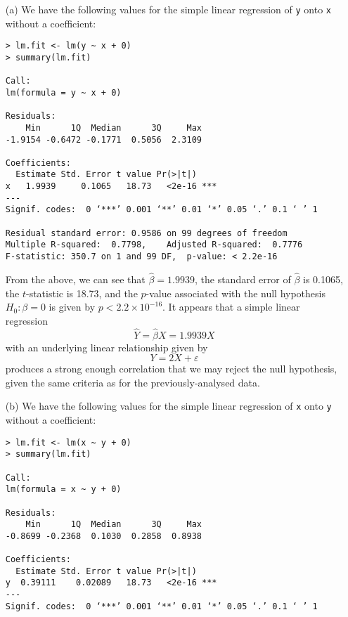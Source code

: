 
\begin{itemize}
    \item[(a)] We have the following values for the simple linear regression of
        \verb|y| onto \verb|x| without a coefficient:
        \scriptsize\begin{verbatim}
> lm.fit <- lm(y ~ x + 0)
> summary(lm.fit)

Call:
lm(formula = y ~ x + 0)

Residuals:
    Min      1Q  Median      3Q     Max 
-1.9154 -0.6472 -0.1771  0.5056  2.3109 

Coefficients:
  Estimate Std. Error t value Pr(>|t|)    
x   1.9939     0.1065   18.73   <2e-16 ***
---
Signif. codes:  0 ‘***’ 0.001 ‘**’ 0.01 ‘*’ 0.05 ‘.’ 0.1 ‘ ’ 1

Residual standard error: 0.9586 on 99 degrees of freedom
Multiple R-squared:  0.7798,    Adjusted R-squared:  0.7776 
F-statistic: 350.7 on 1 and 99 DF,  p-value: < 2.2e-16
        \end{verbatim}\normalsize
        From the above, we can see that $\hat{\beta} = 1.9939$, the standard error
        of $\hat{\beta}$ is 0.1065, the $t$-statistic is 18.73, and the $p$-value
        associated with the null hypothesis $H_0 : \beta = 0$ is given by 
        $p < 2.2 \times 10^{-16}$. It appears that a simple linear regression 
        \[
            \hat{Y} = \hat{\beta} X = 1.9939X
        \]
        with an underlying linear relationship given by 
        \[
            Y = 2X + \varepsilon
        \]
        produces a strong enough correlation that we may reject the null hypothesis, 
        given the same criteria as for the previously-analysed 
        data.
    \item[(b)] We have the following values for the simple linear regression of 
        \verb|x| onto \verb|y| without a coefficient:
        \scriptsize\begin{verbatim}
> lm.fit <- lm(x ~ y + 0)
> summary(lm.fit)

Call:
lm(formula = x ~ y + 0)

Residuals:
    Min      1Q  Median      3Q     Max 
-0.8699 -0.2368  0.1030  0.2858  0.8938 

Coefficients:
  Estimate Std. Error t value Pr(>|t|)    
y  0.39111    0.02089   18.73   <2e-16 ***
---
Signif. codes:  0 ‘***’ 0.001 ‘**’ 0.01 ‘*’ 0.05 ‘.’ 0.1 ‘ ’ 1


\end{verbatim}
\end{itemize}
